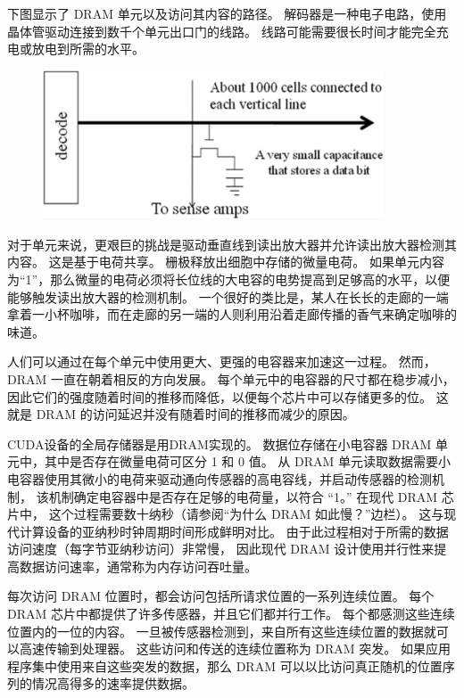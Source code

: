 \begin{remark}
下图显示了 DRAM 单元以及访问其内容的路径。 解码器是一种电子电路，使用晶体管驱动连接到数千个单元出口门的线路。 
线路可能需要很长时间才能完全充电或放电到所需的水平。

\begin{figure}[H]
	\centering
	\includegraphics[width=0.9\textwidth]{figs/F6-a.1.png}
\end{figure}

对于单元来说，更艰巨的挑战是驱动垂直线到读出放大器并允许读出放大器检测其内容。 
这是基于电荷共享。 栅极释放出细胞中存储的微量电荷。 
如果单元内容为“1”，那么微量的电荷必须将长位线的大电容的电势提高到足够高的水平，以便能够触发读出放大器的检测机制。 
一个很好的类比是，某人在长长的走廊的一端拿着一小杯咖啡，而在走廊的另一端的人则利用沿着走廊传播的香气来确定咖啡的味道。

人们可以通过在每个单元中使用更大、更强的电容器来加速这一过程。 然而，DRAM 一直在朝着相反的方向发展。 
每个单元中的电容器的尺寸都在稳步减小，因此它们的强度随着时间的推移而降低，以便每个芯片中可以存储更多的位。 
这就是 DRAM 的访问延迟并没有随着时间的推移而减少的原因。
\end{remark}

CUDA设备的全局存储器是用DRAM实现的。 数据位存储在小电容器 DRAM 单元中，其中是否存在微量电荷可区分 1 和 0 值。 
从 DRAM 单元读取数据需要小电容器使用其微小的电荷来驱动通向传感器的高电容线，并启动传感器的检测机制，
该机制确定电容器中是否存在足够的电荷量，以符合 “1。” 在现代 DRAM 芯片中，
这个过程需要数十纳秒（请参阅“为什么 DRAM 如此慢？”边栏）。 这与现代计算设备的亚纳秒时钟周期时间形成鲜明对比。 
由于此过程相对于所需的数据访问速度（每字节亚纳秒访问）非常慢，
因此现代 DRAM 设计使用并行性来提高数据访问速率，通常称为内存访问吞吐量。

每次访问 DRAM 位置时，都会访问包括所请求位置的一系列连续位置。 
每个 DRAM 芯片中都提供了许多传感器，并且它们都并行工作。 每个都感测这些连续位置内的一位的内容。 
一旦被传感器检测到，来自所有这些连续位置的数据就可以高速传输到处理器。 这些访问和传送的连续位置称为 DRAM 突发。 
如果应用程序集中使用来自这些突发的数据，那么 DRAM 可以以比访问真正随机的位置序列的情况高得多的速率提供数据。


